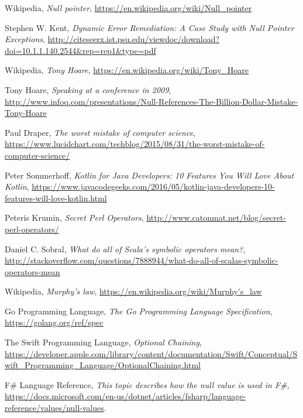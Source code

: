 \documentclass[11pt, a4paper]{report}
\begin{document}
\begin{thebibliography}{100}
	
    Wikipedia,
    \emph{Null pointer},
    \url{https://en.wikipedia.org/wiki/Null_pointer}

    Stephen W. Kent,
    \textit{Dynamic Error Remediation: A Case Study with Null Pointer Exceptions},
    \url{http://citeseerx.ist.psu.edu/viewdoc/download?doi=10.1.1.140.2544&rep=rep1&type=pdf}

    Wikipedia,
    \textit{Tony Hoare},
    \url{https://en.wikipedia.org/wiki/Tony_Hoare}
    
    Tony Hoare,
    \textit{Speaking at a conference in 2009},
    \url{http://www.infoq.com/presentations/Null-References-The-Billion-Dollar-Mistake-Tony-Hoare}

    Paul Draper,
    \textit{The worst mistake of computer science},
    \url{https://www.lucidchart.com/techblog/2015/08/31/the-worst-mistake-of-computer-science/}

 	Peter Sommerhoff,
 	\textit{Kotlin for Java Developers: 10 Features You Will Love About Kotlin},
 	\url{https://www.javacodegeeks.com/2016/05/kotlin-java-developers-10-features-will-love-kotlin.html}

    Peteris Krumin,
    \textit{Secret Perl Operators},
    \url{http://www.catonmat.net/blog/secret-perl-operators/}

    Daniel C. Sobral,
    \textit{What do all of Scala's symbolic operators mean?},
    \url{http://stackoverflow.com/questions/7888944/what-do-all-of-scalas-symbolic-operators-mean}
    
    Wikipedia,
    \textit{Murphy's law},
    \url{https://en.wikipedia.org/wiki/Murphy's_law}

    Go Programming Language,
    \textit{The Go Programming Language Specification},
    \url{https://golang.org/ref/spec}

    The Swift Programming Language,
    \textit{Optional Chaining},
    \url{https://developer.apple.com/library/content/documentation/Swift/Conceptual/Swift_Programming_Language/OptionalChaining.html}
    
    F\# Language Reference,
    \textit{This topic describes how the null value is used in F\#},
    \url{https://docs.microsoft.com/en-us/dotnet/articles/fsharp/language-reference/values/null-values}.


\end{thebibliography}
\end{document}
